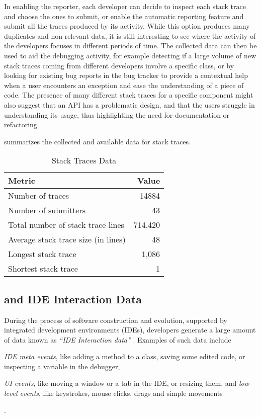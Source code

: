 In enabling the reporter, each developer can decide to inspect each stack trace and choose the ones to submit, or enable the automatic reporting feature and submit all the traces produced by its activity. While this option produces many duplicates and non relevant data, it is still interesting to see where the activity of the developers focuses in different periods of time. The collected data can then be used to aid the debugging activity, for example detecting if a large volume of new stack traces coming from different developers involve a specific class, or by looking for existing bug reports in the bug tracker to provide a contextual help when a user encounters an exception and ease the understanding of a piece of code. The presence of many different stack traces for a specific component might also suggest that an API has a problematic design, and that the users struggle in understanding its usage, thus highlighting the need for documentation or refactoring.

 summarizes the collected and available data for stack traces.

\begin{table}[ht]
\caption{Stack Traces Data}
\label{tab:stacktraces}
\begin{tabularx}{\linewidth}{X|r}

\rowcolor{gray!30} \textbf{Metric} & \textbf{Value} \\ \hline Number of traces & 14884 \\
 Number of submitters & 43 \\
 Total number of stack trace lines & 714,420 \\
 Average stack trace size (in lines) & 48 \\
 Longest stack trace & 1,086 \\
 Shortest stack trace & 1 \\
\end{tabularx}
\end{table}




\subsection{\dfl and IDE Interaction Data}\label{sub:interaction}

During the process of software construction and evolution, supported by integrated development environments (IDEs), developers generate a large amount of data known as \emph{``IDE Interaction data''} \cite{Kers2005, Murp2006}. Examples of such data include \begin{inparaenum}[i)] \item \emph{IDE meta events}, like adding a method to a class, saving some edited code, or inspecting a variable in the debugger, \item \emph{UI events}, like moving a window or a tab in the IDE, or resizing them, and \emph{low-level events}, like keystrokes, mouse clicks, drags and simple movements\end{inparaenum}. 

